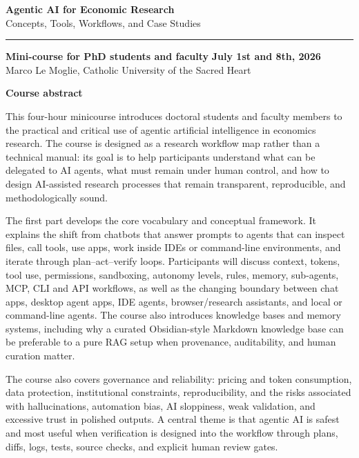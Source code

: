 \documentclass[10pt]{article}
\begin{document}
\thispagestyle{empty}

{\Large\bfseries\color{deepblue} Agentic AI for Economic Research}\\[-0.15em]
{\large Concepts, Tools, Workflows, and Case Studies}\\[0.25em]
{\color{accent}\rule{\linewidth}{1.2pt}}

\vspace{0.4em}

\textbf{Mini-course for PhD students and faculty} \hfill
\textbf{July 1st and 8th, 2026}\\
Marco Le Moglie, Catholic University of the Sacred Heart

\vspace{0.5em}

\textbf{\color{deepblue}Course abstract}

This four-hour minicourse introduces doctoral students and faculty members to
the practical and critical use of agentic artificial intelligence in economics
research. The course is designed as a research workflow map rather than a
technical manual: its goal is to help participants understand what can be
delegated to AI agents, what must remain under human control, and how to design
AI-assisted research processes that remain transparent, reproducible, and
methodologically sound.

The first part develops the core vocabulary and conceptual framework. It
explains the shift from chatbots that answer prompts to agents that can inspect
files, call tools, use apps, work inside IDEs or command-line environments, and
iterate through plan--act--verify loops. Participants will discuss context,
tokens, tool use, permissions, sandboxing, autonomy levels, rules, memory,
sub-agents, MCP, CLI and API workflows, as well as the changing boundary
between chat apps, desktop agent apps, IDE agents, browser/research assistants,
and local or command-line agents. The course also introduces knowledge bases
and memory systems, including why a curated Obsidian-style Markdown knowledge
base can be preferable to a pure RAG setup when provenance, auditability, and
human curation matter.

The course also covers governance and reliability: pricing and token
consumption, data protection, institutional constraints, reproducibility, and
the risks associated with hallucinations, automation bias, AI sloppiness, weak
validation, and excessive trust in polished outputs. A central theme is that
agentic AI is safest and most useful when verification is designed into the
workflow through plans, diffs, logs, tests, source checks, and explicit human
review gates.
\end{document}
